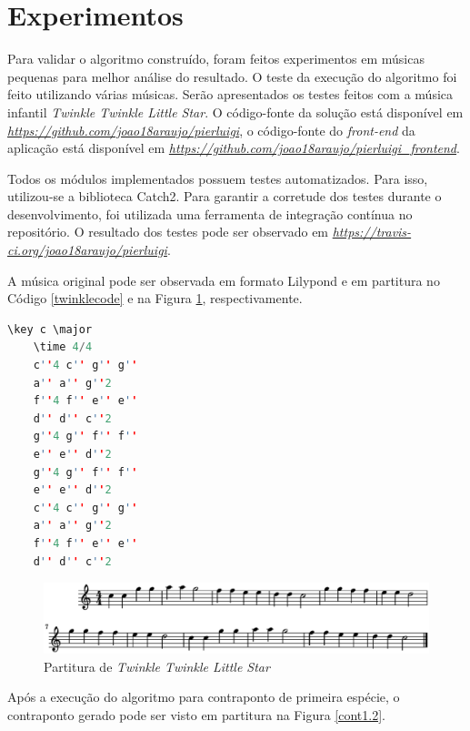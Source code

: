   \section[Experimentos]{Experimentos}

    Para validar o algoritmo construído, foram feitos experimentos em músicas pequenas para melhor análise do resultado. O teste da execução do algoritmo foi feito utilizando várias músicas. Serão apresentados os testes feitos com a música infantil \textit{Twinkle Twinkle Little Star}. O código-fonte da solução está disponível em \textit{\url{https://github.com/joao18araujo/pierluigi}}, o código-fonte do \textit{front-end} da aplicação está disponível em \textit{\url{https://github.com/joao18araujo/pierluigi_frontend}}.

    Todos os módulos implementados possuem testes automatizados. Para isso, utilizou-se a biblioteca Catch2. Para garantir a corretude dos testes durante o desenvolvimento, foi utilizada uma ferramenta de integração contínua no repositório. O resultado dos testes pode ser observado em \textit{\url{https://travis-ci.org/joao18araujo/pierluigi}}.

    A música original pode ser observada em formato Lilypond e em partitura no Código \ref{twinklecode} e na Figura \ref{twinkleoriginal}, respectivamente.

    \begin{lstlisting}[language={C++}, caption={\textit{Twinkle Twinkle Little Star}}, label={twinklecode}]
    \key c \major
    \time 4/4
    c''4 c'' g'' g''
    a'' a'' g''2
    f''4 f'' e'' e''
    d'' d'' c''2
    g''4 g'' f'' f''
    e'' e'' d''2
    g''4 g'' f'' f''
    e'' e'' d''2
    c''4 c'' g'' g''
    a'' a'' g''2
    f''4 f'' e'' e''
    d'' d'' c''2
    \end{lstlisting}

    \begin{figure}[htb]
      \centering
      \includegraphics[scale=0.6]{figuras/twinkleoriginal.eps}
      \caption{Partitura de \textit{Twinkle Twinkle Little Star}}
      \label{twinkleoriginal}
    \end{figure}

    Após a execução do algoritmo para contraponto de primeira espécie, o contraponto gerado pode ser visto em partitura na Figura \ref{cont1.2}.

